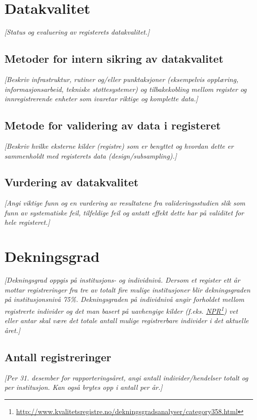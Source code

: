 \documentclass[norsk, a4paper, twocolumn]{report}
\newcommand{\guide}[1] {
	\textit{[\textcolor{guidegray}{#1}]}
	}
\begin{document}
\chapter{Datakvalitet}\label{cha:kva}
\guide{Status og evaluering av registerets  datakvalitet.}

\section{Metoder for intern sikring av datakvalitet}\label{sec:sik}
\guide{Beskriv infrastruktur, rutiner og/eller punktaksjoner (eksempelvis
opplæring, informasjonsarbeid, tekniske støttesystemer) og tilbakekobling mellom register og innregistrerende enheter som ivaretar riktige og
komplette data.}

\section{Metode for validering av data i registeret}\label{sec:metval}
\guide{Beskriv hvilke eksterne kilder (registre) som er benyttet og hvordan
dette er sammenholdt med registerets data (design/subsampling).} 

\section{Vurdering av datakvalitet}\label{sec:valdat}
\guide{Angi viktige funn og en vurdering av resultatene fra
valideringsstudien slik som funn av systematiske feil, tilfeldige feil og
antatt effekt dette har på validitet for hele registeret.}




\chapter{Dekningsgrad}\label{cha:dek}
\guide{Dekningsgrad oppgis på institusjons- og individnivå. Dersom
et register ett år mottar registreringer fra tre
av totalt fire mulige institusjoner blir dekningsgraden på
institusjonsnivå 75\%. Dekningsgraden på individnivå angir
forholdet mellom registrerte individer og det man basert på uavhengige
kilder (f.eks.
\href{http://www.kvalitetsregistre.no/dekningsgradsanalyser/category358.html}
{NPR}\footnote{\url{http://www.kvalitetsregistre.no/dekningsgradsanalyser/category358.html}})
vet eller antar skal være det totale antall mulige registrerbare
individer i det aktuelle året.}

\section{Antall registreringer}\label{sec:reg}
\guide{Per 31. desember for rapporteringsåret, angi antall
individer/hendelser totalt og per institusjon. Kan også brytes opp i antall per år.}
\end{document}
